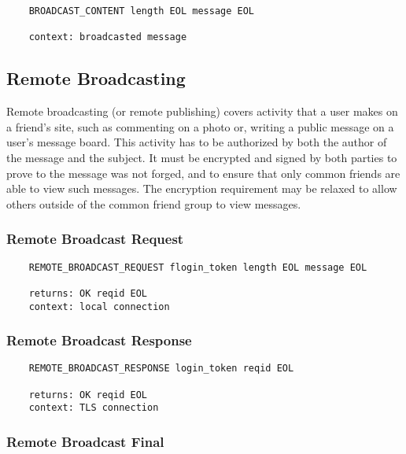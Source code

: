 \documentclass[letterpaper,11pt,oneside]{article}
\begin{document}
\vspace{10pt}
\begin{verbatim}
    BROADCAST_CONTENT length EOL message EOL

    context: broadcasted message
\end{verbatim}

\subsection{Remote Broadcasting}

Remote broadcasting (or remote publishing) covers activity that a user makes on
a friend's site, such as commenting on a photo or, writing a public message on
a user's message board. This activity has to be authorized by both the author
of the message and the subject. It must be encrypted and signed by both parties
to prove to the message was not forged, and to ensure that only common friends
are able to view such messages. The encryption requirement may be relaxed to
allow others outside of the common friend group to view messages.

\subsubsection{Remote Broadcast Request}

\vspace{10pt}
\begin{verbatim}
    REMOTE_BROADCAST_REQUEST flogin_token length EOL message EOL

    returns: OK reqid EOL
    context: local connection
\end{verbatim}
\vspace{10pt}

\subsubsection{Remote Broadcast Response}

\vspace{10pt}
\begin{verbatim}
    REMOTE_BROADCAST_RESPONSE login_token reqid EOL 

    returns: OK reqid EOL
    context: TLS connection
\end{verbatim}
\vspace{10pt}

\subsubsection{Remote Broadcast Final}
\end{document}
